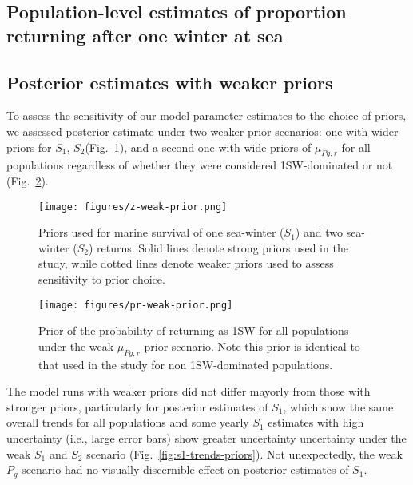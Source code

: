 \documentclass[12pt]{article}
\newcommand{\So}{$S_{1}$\xspace}
\newcommand{\St}{$S_{2}$\xspace}
\newcommand{\Pg}{$P_g$\xspace}
\newcommand{\prmu}{$\mu_{Pg,r}$\xspace}
\begin{document}
\clearpage

\subsection*{Population-level estimates of proportion returning after one winter at sea}



\hspace{8em}



\clearpage

\subsection*{Posterior estimates with weaker priors}

To assess the sensitivity of our model parameter estimates to the choice of
priors, we assessed posterior estimate under two weaker prior scenarios:
one with wider priors for \So, \St (Fig.~\ref{fig:zweak}), and a second one with wide priors
of \prmu for all populations regardless of whether they were considered
1SW-dominated or not (Fig.~\ref{fig:prweak}).

\begin{figure}[htbp] \centering
    \texttt{[image: figures/z-weak-prior.png]}
    \caption{Priors used for marine survival of one sea-winter (\So) and two
        sea-winter (\St) returns. Solid lines denote strong priors used in the
        study, while dotted lines denote weaker priors used to assess
        sensitivity to prior choice.} \label{fig:zweak} \end{figure}

\begin{figure}[htbp] \centering
    \texttt{[image: figures/pr-weak-prior.png]}
    \caption{Prior of the probability of returning as 1SW for all populations
        under the weak \prmu prior scenario. Note this prior is identical to
        that used in the study for non 1SW-dominated populations.}
    \label{fig:prweak} \end{figure}

The model runs with weaker priors did not differ mayorly from those with
stronger priors, particularly for posterior estimates of \So, which show the
same overall trends for all populations and some yearly \So estimates with
high uncertainty (i.e., large error bars) show greater uncertainty uncertainty
under the weak \So and \St scenario (Fig.~\ref{fig:s1-trends-priors}).
Not unexpectedly, the weak \Pg scenario had no visually discernible effect on
posterior estimates of \So.
\end{document}
